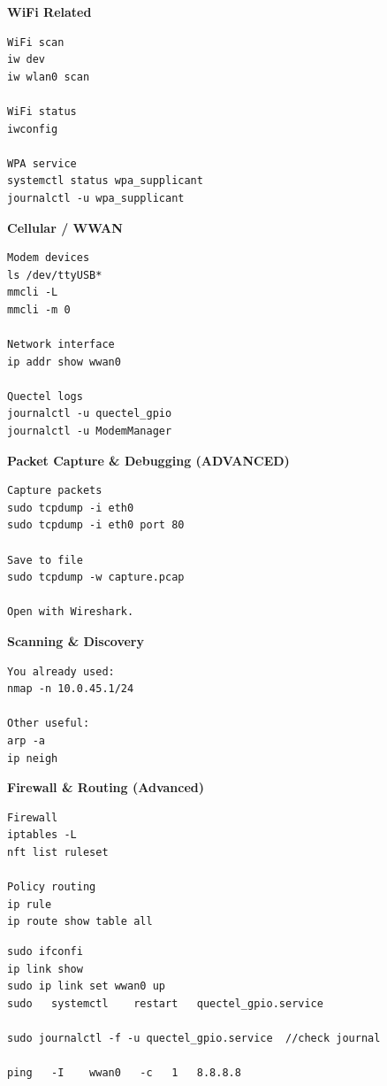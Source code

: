 \documentclass[paper=8.5in:11in, twoside, 12pt, pagesize=pdftex]{book}
\begin{document}
\textbf{WiFi Related}
\begin{lstlisting}
WiFi scan
iw dev
iw wlan0 scan

WiFi status
iwconfig

WPA service
systemctl status wpa_supplicant
journalctl -u wpa_supplicant
\end{lstlisting}

\textbf{Cellular / WWAN}
\begin{lstlisting}
Modem devices
ls /dev/ttyUSB*
mmcli -L
mmcli -m 0

Network interface
ip addr show wwan0

Quectel logs
journalctl -u quectel_gpio
journalctl -u ModemManager
\end{lstlisting}


\textbf{Packet Capture \& Debugging (ADVANCED)}
\begin{lstlisting}
Capture packets
sudo tcpdump -i eth0
sudo tcpdump -i eth0 port 80

Save to file
sudo tcpdump -w capture.pcap

Open with Wireshark.
\end{lstlisting}


\textbf{Scanning \& Discovery}
\begin{lstlisting}
You already used:
nmap -n 10.0.45.1/24

Other useful:
arp -a
ip neigh
\end{lstlisting}

\textbf{Firewall \& Routing (Advanced)}
\begin{lstlisting}
Firewall
iptables -L
nft list ruleset

Policy routing
ip rule
ip route show table all
\end{lstlisting}

\begin{lstlisting}
sudo ifconfi
ip link show
sudo ip link set wwan0 up
sudo   systemctl    restart   quectel_gpio.service

sudo journalctl -f -u quectel_gpio.service  //check journal

ping   -I    wwan0   -c   1   8.8.8.8 
\end{lstlisting}
\end{document}
